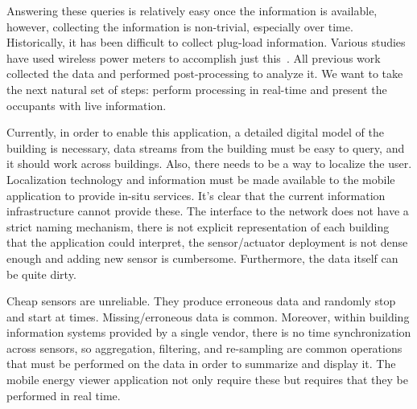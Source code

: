 Answering these queries is relatively easy once the information is available, however, collecting the information
is non-trivial, especially over time.  Historically, it has been difficult to collect plug-load information.
Various studies have used wireless power meters to accomplish just this~\cite{stephscale, lanz, aceee}.
All previous work collected the data and performed post-processing to analyze it.  We want to take the next
natural set of steps: perform processing in real-time and present the occupants with live information.

Currently, in order to enable this application, a detailed digital model of the building is necessary, data streams from the building must
be easy to query, and it should work across buildings.  Also, there needs to be a way to localize the user. 
Localization technology and information must be made available to the mobile application to provide in-situ services.
It's clear that the current information infrastructure cannot provide these.  The interface to the network does not have
a strict naming mechanism, there is not explicit representation of each building that the application could interpret, 
the sensor/actuator deployment is not dense enough and adding new sensor is cumbersome.  Furthermore, the data itself can be quite dirty.

Cheap sensors are unreliable.  They produce erroneous data and randomly stop and start at times.  Missing/erroneous data is common.
Moreover, within building information systems provided by a single vendor, there is no time synchronization across sensors, so
aggregation, filtering, and re-sampling are common operations that must be performed on the data in order to summarize and display it.
The mobile energy viewer application not only require these but requires that they be performed in real time.




